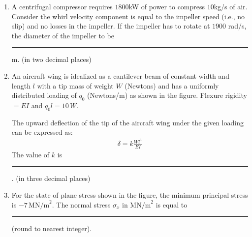 \documentclass[journal]{IEEEtran}
\begin{document}
\begin{enumerate}[start=40]
\item A centrifugal compressor requires $1800 $kW of power to compress $10 $kg/s of air. Consider the whirl velocity component is equal to the impeller speed (i.e., no slip) and no losses in the impeller. If the impeller has to rotate at $1900$ rad/s, the diameter of the impeller to be \rule{1cm}{0.4 pt} m. (in two decimal places) 

\item An aircraft wing is idealized as a cantilever beam of constant width and length $ l $ with a tip mass of weight $ W $ (Newtons) and has a uniformly distributed loading of $ q_0 $ (Newtons/m) as shown in the figure. Flexure rigidity  $= EI $ and $ q_0 l = 10 \, W $.
\begin{center}
    


\end{center}
The upward deflection of the tip of the aircraft wing under the given loading can be expressed as:
\begin{align*}
    \delta=k\frac{Wl^3}{EI}
\end{align*}
The value of $k$  is \rule{1cm}{0.4 pt} . (in three decimal places)


\item For the state of plane stress shown in the figure, the minimum principal stress is $ -7 \, {\text{MN/m}}^2 $. The normal stress $ \sigma_x  \text{ in } {\text{MN/m}}^2$ is equal to \rule{1cm}{0.4 pt} (round to nearest integer).


\end{enumerate}
\end{document}
